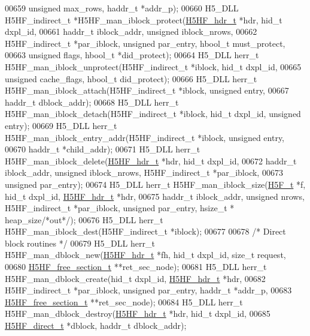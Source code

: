 \begin{DoxyCode}
00659     \textcolor{keywordtype}{unsigned} max\_rows, haddr\_t *addr\_p);
00660 H5\_DLL H5HF\_indirect\_t *H5HF\_man\_iblock\_protect(\hyperlink{struct_h5_h_f__hdr__t}{H5HF\_hdr\_t} *hdr, hid\_t dxpl\_id,
00661     haddr\_t iblock\_addr, \textcolor{keywordtype}{unsigned} iblock\_nrows,
00662     H5HF\_indirect\_t *par\_iblock, \textcolor{keywordtype}{unsigned} par\_entry, hbool\_t must\_protect,
00663     \textcolor{keywordtype}{unsigned} flags, hbool\_t *did\_protect);
00664 H5\_DLL herr\_t H5HF\_man\_iblock\_unprotect(H5HF\_indirect\_t *iblock, hid\_t dxpl\_id,
00665     \textcolor{keywordtype}{unsigned} cache\_flags, hbool\_t did\_protect);
00666 H5\_DLL herr\_t H5HF\_man\_iblock\_attach(H5HF\_indirect\_t *iblock, \textcolor{keywordtype}{unsigned} entry,
00667     haddr\_t dblock\_addr);
00668 H5\_DLL herr\_t H5HF\_man\_iblock\_detach(H5HF\_indirect\_t *iblock, hid\_t dxpl\_id, \textcolor{keywordtype}{unsigned} entry);
00669 H5\_DLL herr\_t H5HF\_man\_iblock\_entry\_addr(H5HF\_indirect\_t *iblock, \textcolor{keywordtype}{unsigned} entry,
00670     haddr\_t *child\_addr);
00671 H5\_DLL herr\_t H5HF\_man\_iblock\_delete(\hyperlink{struct_h5_h_f__hdr__t}{H5HF\_hdr\_t} *hdr, hid\_t dxpl\_id,
00672     haddr\_t iblock\_addr, \textcolor{keywordtype}{unsigned} iblock\_nrows, H5HF\_indirect\_t *par\_iblock,
00673     \textcolor{keywordtype}{unsigned} par\_entry);
00674 H5\_DLL herr\_t H5HF\_man\_iblock\_size(\hyperlink{struct_h5_f__t}{H5F\_t} *f, hid\_t dxpl\_id, \hyperlink{struct_h5_h_f__hdr__t}{H5HF\_hdr\_t} *hdr,
00675     haddr\_t iblock\_addr, \textcolor{keywordtype}{unsigned} nrows, H5HF\_indirect\_t *par\_iblock, \textcolor{keywordtype}{unsigned} par\_entry, hsize\_t *
      heap\_size\textcolor{comment}{/*out*/});
00676 H5\_DLL herr\_t H5HF\_man\_iblock\_dest(H5HF\_indirect\_t *iblock);
00677 
00678 \textcolor{comment}{/* Direct block routines */}
00679 H5\_DLL herr\_t H5HF\_man\_dblock\_new(\hyperlink{struct_h5_h_f__hdr__t}{H5HF\_hdr\_t} *fh, hid\_t dxpl\_id, \textcolor{keywordtype}{size\_t} request,
00680     \hyperlink{struct_h5_h_f__free__section__t}{H5HF\_free\_section\_t} **ret\_sec\_node);
00681 H5\_DLL herr\_t H5HF\_man\_dblock\_create(hid\_t dxpl\_id, \hyperlink{struct_h5_h_f__hdr__t}{H5HF\_hdr\_t} *hdr,
00682     H5HF\_indirect\_t *par\_iblock, \textcolor{keywordtype}{unsigned} par\_entry, haddr\_t *addr\_p,
00683     \hyperlink{struct_h5_h_f__free__section__t}{H5HF\_free\_section\_t} **ret\_sec\_node);
00684 H5\_DLL herr\_t H5HF\_man\_dblock\_destroy(\hyperlink{struct_h5_h_f__hdr__t}{H5HF\_hdr\_t} *hdr, hid\_t dxpl\_id,
00685     \hyperlink{struct_h5_h_f__direct__t}{H5HF\_direct\_t} *dblock, haddr\_t dblock\_addr);

\end{DoxyCode}
